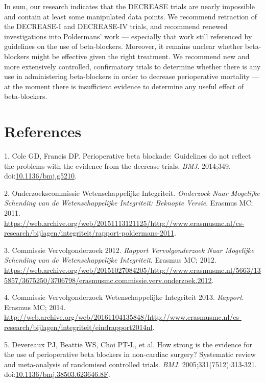 \documentclass[]{article}
\begin{document}
In sum, our research indicates that the DECREASE trials are nearly
impossible and contain at least some manipulated data points. We
recommend retraction of the DECREASE-I and DECREASE-IV trials, and
recommend renewed investigations into Poldermans' work --- especially
that work still referenced by guidelines on the use of beta-blockers.
Moreover, it remains unclear whether beta-blockers might be effective
given the right treatment. We recommend new and more extensively
controlled, confirmatory trials to determine whether there is any use in
administering beta-blockers in order to decrease perioperative mortality
--- at the moment there is insufficient evidence to determine any useful
effect of beta-blockers.

\section*{References}\label{references}

\hypertarget{refs}{}
\hypertarget{ref-Coleg5210}{}
1. Cole GD, Francis DP. Perioperative beta blockade: Guidelines do not
reflect the problems with the evidence from the decrease trials.
\emph{BMJ}. 2014;349.
doi:\href{https://doi.org/10.1136/bmj.g5210}{10.1136/bmj.g5210}.

\hypertarget{ref-commissie2011}{}
2. Onderzoekscommissie Wetenschappelijke Integriteit. \emph{Onderzoek
Naar Mogelijke Schending van de Wetenschappelijke Integriteit: Beknopte
Versie}. Erasmus MC; 2011.
\url{https://web.archive.org/web/20151113121125/http://www.erasmusmc.nl/cs-research/bijlagen/integriteit/rapport-poldermans-2011}.

\hypertarget{ref-commissie2012}{}
3. Commissie Vervolgonderzoek 2012. \emph{Rapport Vervolgonderzoek Naar
Mogelijke Schending van de Wetenschappelijke Integriteit}. Erasmus MC;
2012.
\url{https://web.archive.org/web/20151027084205/http://www.erasmusmc.nl/5663/135857/3675250/3706798/erasmusmc.commissie.verv.onderzoek.2012}.

\hypertarget{ref-commissie2013}{}
4. Commissie Vervolgonderzoek Wetenschappelijke Integriteit 2013.
\emph{Rapport}. Erasmus MC; 2014.
\url{http://web.archive.org/web/20161104135848/http://www.erasmusmc.nl/cs-research/bijlagen/integriteit/eindrapport2014nl}.

\hypertarget{ref-Devereaux313}{}
5. Devereaux PJ, Beattie WS, Choi PT-L, et al. How strong is the
evidence for the use of perioperative beta blockers in non-cardiac
surgery? Systematic review and meta-analysis of randomised controlled
trials. \emph{BMJ}. 2005;331(7512):313-321.
doi:\href{https://doi.org/10.1136/bmj.38503.623646.8F}{10.1136/bmj.38503.623646.8F}.
\end{document}
